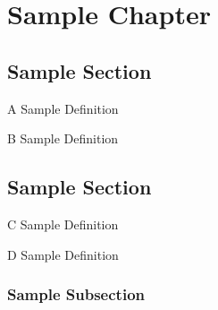 \setcounter{chapter}{-1}
\chapter{Sample Chapter}
\section{Sample Section}
    \begin{definition}
        \label{sec:0}
        A Sample Definition \newline
        \blindtext
    \end{definition}
    \begin{definition}
        \label{sec:1}
        B Sample Definition \newline
        \blindtext
    \end{definition}
    \section{Sample Section}
    \begin{definition}
        \label{sec:2}
        C Sample Definition \newline
        \blindtext
    \end{definition}
    \begin{definition}
        \label{sec:3}
        D Sample Definition \newline
        \blindtext
    \end{definition}
\subsection{Sample Subsection}
    \blindtext
